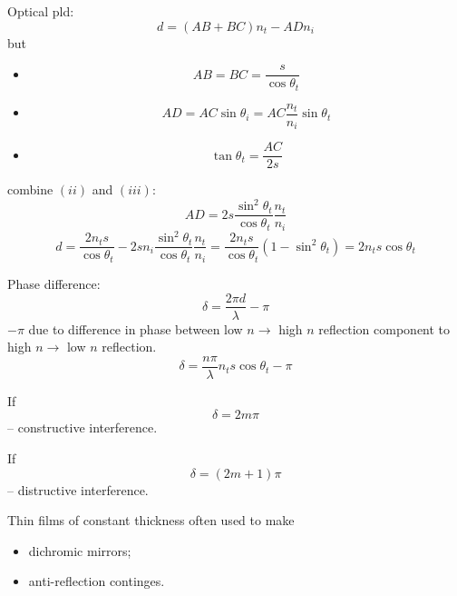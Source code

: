 \documentclass[10pt]{article}
\begin{document}
Optical pld:
\begin{equation*}
d = (AB + BC)n_t - ADn_i
\end{equation*}
but
\begin{itemize}
\item[(i)] \begin{equation*}
AB = BC = \frac{s}{\cos{\theta_t}}
\end{equation*}
\item[(ii)] \begin{equation*}
AD = AC\sin{\theta_i} = AC \frac{n_t}{n_i}\sin{\theta_t}
\end{equation*}
\item[(iii)] \begin{equation*}
\tan{\theta_t} = \frac{AC}{2s}
\end{equation*}
\end{itemize}
combine $(ii)$ and $(iii)$:
\begin{equation*}
AD = 2s \frac{\sin^2{\theta_t}}{\cos{\theta_t}}\frac{n_t}{n_i}
\end{equation*}
\begin{equation*}
d = \frac{2n_t s}{\cos{\theta_t}} - 2sn_i\frac{\sin^2{\theta_t}}{\cos{\theta_t}}\frac{n_t}{n_i} = \frac{2n_t s}{\cos{\theta_t}} \left(1 - \sin^2{\theta_t} \right) = 2n_t s\cos{\theta_t}
\end{equation*}

Phase difference:
\begin{equation*}
\delta = \frac{2 \pi d}{\lambda} - \pi
\end{equation*}
$-\pi$ due to difference in phase between low $n \rightarrow$ high $n$ reflection component to high $n \rightarrow$ low $n$ reflection.
\begin{equation}\boxed{
\delta = \frac{n \pi}{\lambda} n_t s \cos{\theta_t} - \pi
}\end{equation}

If
\begin{equation*}
\delta = 2m\pi
\end{equation*}
-- constructive interference.

If
\begin{equation*}
\delta = (2m+1)\pi
\end{equation*}
-- distructive interference.

Thin films of constant thickness often used to make
\begin{itemize}
\item dichromic mirrors;
\item anti-reflection continges.
\end{itemize}
\end{document}
